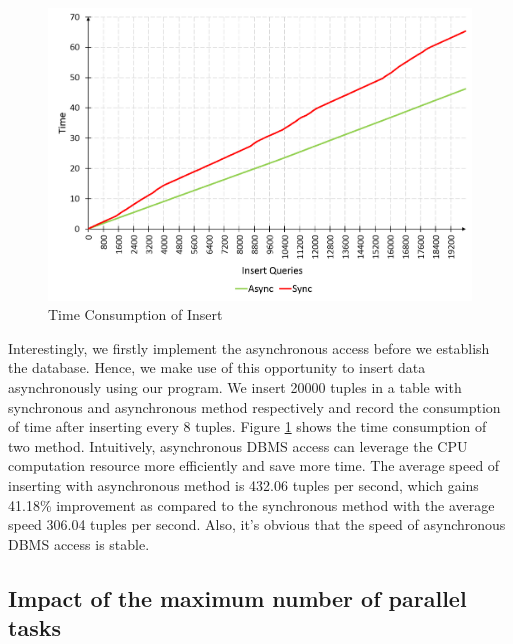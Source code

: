 \documentclass[onecolumn, conference, 12pt]{IEEEtran}
\begin{document}
	\begin{figure}[!t]
		\centering
		\includegraphics[width=6.5in]{fig/insert.png}
		\caption{Time Consumption of Insert}
		\label{fig_insert}
	\end{figure}
	Interestingly, we firstly implement the asynchronous access before we establish the database. Hence, we make use of this opportunity to insert data asynchronously using our program. We insert 20000 tuples in a table with synchronous and asynchronous method respectively and record the consumption of time after inserting every 8 tuples. Figure \ref{fig_insert} shows the time consumption of two method. Intuitively, asynchronous DBMS access can leverage the CPU computation resource more efficiently and save more time. The average speed of inserting with asynchronous method is 432.06 tuples per second, which gains 41.18\% improvement as compared to the synchronous method with the average speed 306.04 tuples per second. Also, it’s obvious that the speed of asynchronous DBMS access is stable.
	
	\subsection{Impact of the maximum number of parallel tasks}
	
\end{document}
